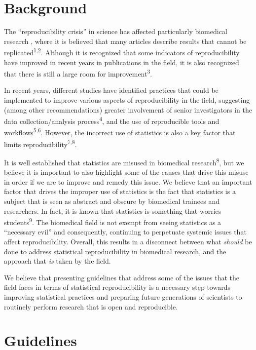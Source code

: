\documentclass[smallextended]{svjour3}       %
\begin{document}
\hypertarget{background}{%
\section{Background}\label{background}}

The ``reproducibility crisis'' in science has affected particularly
biomedical research , where it is believed that many articles describe
results that cannot be replicated\textsuperscript{1,2}. Although it is
recognized that some indicators of reproducibility have improved in
recent years in publications in the field, it is also recognized that
there is still a large room for improvement\textsuperscript{3}.

In recent years, different studies have identified practices that could
be implemented to improve various aspects of reproducibility in the
field, suggesting (among other recommendations) greater involvement of
senior investigators in the data collection/analysis
process\textsuperscript{4}, and the use of reproducible tools and
workflows\textsuperscript{5,6}. However, the incorrect use of statistics
is also a key factor that limits reproducibility\textsuperscript{7,8}.

It is well established that statistics are misused in biomedical
research\textsuperscript{8}, but we believe it is important to also
highlight some of the causes that drive this misuse in order if we are
to improve and remedy this issue. We believe that an important factor
that drives the improper use of statistics is the fact that statistics
is a subject that is seen as abstract and obscure by biomedical trainees
and researchers. In fact, it is known that statistics is something that
worries students\textsuperscript{9}. The biomedical field is not exempt
from seeing statistics as a ``necessary evil'' and consequently,
continuing to perpetuate systemic issues that affect reproducibility.
Overall, this results in a disconnect between what \emph{should} be done
to address statistical reproducibility in biomedical research, and the
approach that \emph{is} taken by the field.

We believe that presenting guidelines that address some of the issues
that the field faces in terms of statistical reproducibility is a
necessary step towards improving statistical practices and preparing
future generations of scientists to routinely perform research that is
open and reproducible.

\hypertarget{guidelines}{%
\section{Guidelines}\label{guidelines}}
\end{document}

